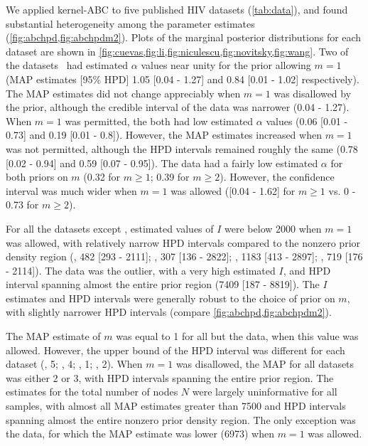 We applied kernel-ABC to five published HIV datasets (\cref{tab:data}),
and found substantial heterogeneity among the parameter estimates
(\cref{fig:abchpd,fig:abchpdm2}). Plots of the marginal posterior distributions
for each dataset are shown in
\cref{fig:cuevas,fig:li,fig:niculescu,fig:novitsky,fig:wang}.
Two of the datasets~\autocite{niculescu2015recent, wang2015targeting} had
estimated $\alpha$ values near unity for the prior allowing $m = 1$ (MAP
estimates [95\% HPD] 
  1.05 
  [0.04 - 
   1.27]
and
  0.84 
  [0.01 -
   1.02] respectively).
The MAP estimates did not change appreciably when $m = 1$ was disallowed by the
prior, although the credible interval of the \textcite{niculescu2015recent}
data was narrower
  (0.04 - 
   1.27).
When $m = 1$ was permitted, the \textcite{li2015hiv, cuevas2009hiv} both had
low estimated $\alpha$ values
  (0.06 
  [0.01 - 
  0.73]
and
  0.19 
  [0.01 -
   0.8]). 
However, the MAP estimates increased when $m = 1$ was not permitted, although
the HPD intervals remained roughly the same
  (0.78 
  [0.02 - 
  0.94]
and
  0.59 
  [0.07 -
   0.95]).
The \textcite{novitsky2014impact} data had a fairly low estimated $\alpha$
for both priors on $m$
  (0.32 for $m \geq 1$;
   0.39 for $m \geq 2$).
However, the confidence interval was much wider when $m = 1$ was allowed
  ([0.04 -
    1.62] for $m \geq 1$ vs.
    0 -
    0.73 for $m \geq 2$).

For all the datasets except \citeauthor{novitsky2014impact}, estimated values
of $I$ were below 2000 when $m = 1$ was allowed, with relatively narrow HPD
intervals compared to the nonzero prior density region
  (\citeauthor{cuevas2009hiv}, 482 
  [293 -
   2111];
   \citeauthor{niculescu2015recent}, 307
  [136 - 
   2822];
  \citeauthor{li2015hiv}, 1183 
  [413 -
   2897];
   \citeauthor{wang2015targeting}, 719
  [176 - 
   2114]).
The \citeauthor{novitsky2014impact} data was the outlier, with a very high
estimated $I$, and HPD interval spanning almost the entire prior region
  (7409 
  [187 -
   8819]).
The $I$ estimates and HPD intervals were generally robust to the choice of
prior on $m$, with slightly narrower HPD intervals (compare
\cref{fig:abchpd,fig:abchpdm2}).

The MAP estimate of $m$ was equal to 1 for all but the
\citeauthor{novitsky2014impact} data, when this value was allowed. However, the
upper bound of the HPD interval was different for each dataset
  (\citeauthor{niculescu2015recent}, 5;
   \citeauthor{wang2015targeting}, 4;
   \citeauthor{li2015hiv}, 1;
   \citeauthor{cuevas2009hiv}, 2).
When $m = 1$ was disallowed, the MAP for all datasets was either 2 or 3, with
HPD intervals spanning the entire prior region. The estimates for the total
number of nodes $N$ were largely uninformative for all samples, with almost all
MAP estimates greater than 7500 and HPD intervals spanning almost the entire
nonzero prior density region. The only exception was the \citeauthor{li2015hiv}
data, for which the MAP estimate was lower 
  (6973)
when $m = 1$ was allowed.

